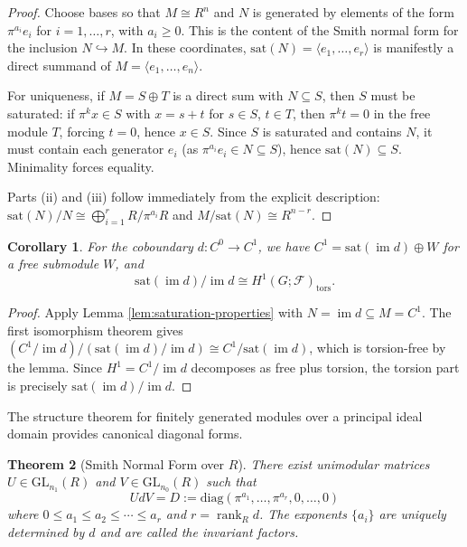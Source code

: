 \documentclass[11pt]{amsart}
\theoremstyle{plain}
\newtheorem{theorem}{Theorem}[section]
\newtheorem{corollary}[theorem]{Corollary}
\theoremstyle{definition}
\newcommand{\Ring}{R}                          %
\newcommand{\unif}{\pi}                        %
\newcommand{\sheaf}[1]{\mathcal{#1}}                  %
\newcommand{\sat}{\mathrm{sat}}
\newcommand{\tors}{\mathrm{tors}}
\newcommand{\coboundary}{d}                           %
\DeclareMathOperator{\im}{im}                         %
\DeclareMathOperator{\rank}{rank}
\begin{document}
\begin{proof}
Choose bases so that $M \cong \Ring^n$ and $N$ is generated by elements of the 
form $\unif^{a_i} e_i$ for $i = 1, \ldots, r$, with $a_i \geq 0$. This is the 
content of the Smith normal form for the inclusion $N \hookrightarrow M$. In these 
coordinates, $\sat(N) = \langle e_1, \ldots, e_r \rangle$ is manifestly a direct 
summand of $M = \langle e_1, \ldots, e_n \rangle$.

For uniqueness, if $M = S \oplus T$ is a direct sum with $N \subseteq S$, then 
$S$ must be saturated: if $\unif^k x \in S$ with $x = s + t$ for $s \in S$, 
$t \in T$, then $\unif^k t = 0$ in the free module $T$, forcing $t = 0$, hence 
$x \in S$. Since $S$ is saturated and contains $N$, it must contain each generator 
$e_i$ (as $\unif^{a_i} e_i \in N \subseteq S$), hence $\sat(N) \subseteq S$. 
Minimality forces equality.

Parts (ii) and (iii) follow immediately from the explicit description: $\sat(N)/N 
\cong \bigoplus_{i=1}^r \Ring/\unif^{a_i}\Ring$ and $M/\sat(N) \cong \Ring^{n-r}$.
\end{proof}

\begin{corollary}
\label{cor:saturation-summand}
For the coboundary $\coboundary: C^0 \to C^1$, we have $C^1 = \sat(\im \coboundary) 
\oplus W$ for a free submodule $W$, and
\[
\sat(\im \coboundary)/\im \coboundary \cong H^1(G; \sheaf{F})_{\tors}.
\]
\end{corollary}

\begin{proof}
Apply Lemma \ref{lem:saturation-properties} with $N = \im \coboundary \subseteq 
M = C^1$. The first isomorphism theorem gives $(C^1/\im \coboundary)/(\sat(\im \coboundary)/\im \coboundary) 
\cong C^1/\sat(\im \coboundary)$, which is torsion-free by the lemma. Since $H^1 = 
C^1/\im \coboundary$ decomposes as free plus torsion, the torsion part is precisely 
$\sat(\im \coboundary)/\im \coboundary$.
\end{proof}

The structure theorem for finitely generated modules over a principal ideal domain 
provides canonical diagonal forms.

\begin{theorem}[Smith Normal Form over $\Ring$]
\label{thm:snf}
{ \cite{Newman_IntegralMatrices_1972,Kannan1979,Rotman2009}}
There exist unimodular matrices $U \in \mathrm{GL}_{n_1}(\Ring)$ and $V \in 
\mathrm{GL}_{n_0}(\Ring)$ such that
\[
U \coboundary V = D := \mathrm{diag}(\unif^{a_1}, \ldots, \unif^{a_r}, 0, \ldots, 0)
\]
where $0 \leq a_1 \leq a_2 \leq \cdots \leq a_r$ and $r = \rank_\Ring \coboundary$. 
The exponents $\{a_i\}$ are uniquely determined by $\coboundary$ and are called 
the \emph{invariant factors}.
\end{theorem}
\end{document}
